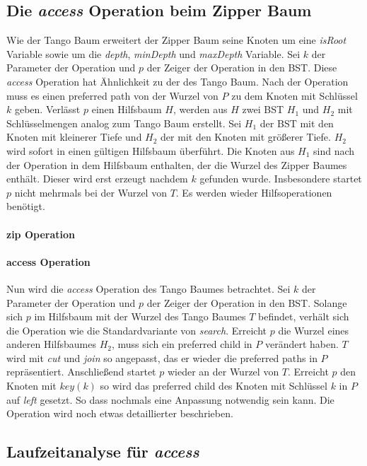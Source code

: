 \documentclass[a4paper,12pt]{article}
\begin{document}
 \subsection{Die \textit{access} Operation beim Zipper Baum}
 Wie der Tango Baum erweitert der Zipper Baum seine Knoten um eine \textit{isRoot} Variable sowie um die \textit{depth},  \textit{minDepth} und \textit{maxDepth} Variable. Sei $k$ der Parameter der Operation und $p$ der Zeiger der Operation in den BST. Diese \textit{access} Operation hat Ähnlichkeit zu der des Tango Baum. Nach der Operation muss es einen preferred path von der Wurzel von $P$ zu dem Knoten mit Schlüssel $k$ geben. Verlässt $p$ einen Hilfsbaum $H$, werden aus $H$ zwei BST $H_1$ und $H_2$ mit Schlüsselmengen analog zum Tango Baum erstellt. Sei $H_1$ der BST mit den Knoten mit kleinerer Tiefe und $H_2$ der mit den Knoten mit größerer Tiefe. $H_2$ wird sofort in einen gültigen Hilfsbaum überführt. Die Knoten aus $H_1$ sind nach der Operation in dem Hilfsbaum enthalten, der die Wurzel des Zipper Baumes enthält. Dieser wird erst erzeugt nachdem $k$ gefunden wurde. Insbesondere startet $p$ nicht mehrmals bei der Wurzel von $T$. Es werden wieder Hilfsoperationen benötigt. 

\paragraph{zip Operation}


\paragraph{access Operation}
Nun wird die \textit{access} Operation des Tango Baumes betrachtet. Sei $k$ der Parameter der Operation und $p$ der Zeiger der Operation in den BST. Solange sich $p$ im Hilfsbaum mit der Wurzel des Tango Baumes $T$ befindet, verhält sich die Operation wie die Standardvariante von \textit{search}. Erreicht $p$ die Wurzel eines anderen Hilfsbaumes $H_2$, muss sich ein preferred child in $P$ verändert haben. $T$ wird mit \textit{cut} und \textit{join} so angepasst, das er wieder die preferred paths in $P$ repräsentiert. Anschließend startet $p$ wieder an der Wurzel von $T$. Erreicht $p$ den Knoten mit $\mathit{key}\left(k\right)$ so wird das preferred child des Knoten mit Schlüssel $k$ in $P$ auf \textit{left} gesetzt. So dass nochmals eine Anpassung notwendig sein kann. Die Operation wird noch etwas detaillierter beschrieben. 



 
  \subsection{Laufzeitanalyse für \textit{access}}
  
\end{document}
